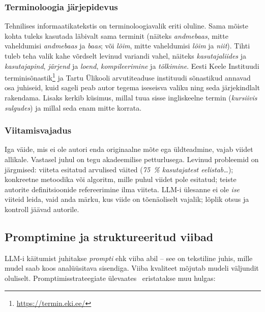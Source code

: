 \subsubsection{Terminoloogia järjepidevus}

Tehnilises informaatikatekstis on terminoloogiavalik eriti oluline. Sama mõiste kohta tuleks kasutada läbivalt sama terminit (näiteks \emph{andmebaas}, mitte vaheldumisi \emph{andmebaas} ja \emph{baas}; või \emph{lõim}, mitte vaheldumisi \emph{lõim} ja \emph{niit}). Tihti tuleb teha valik kahe võrdselt levinud variandi vahel, näiteks \emph{kasutaja\-liides} ja \emph{kasutaja\-pind}, \emph{järjend} ja \emph{loend}, \emph{kompileerimine} ja \emph{tõlkimine}. Eesti Keele Instituudi terminisõnastik\footnote{\url{https://termin.eki.ee/}} ja Tartu Ülikooli arvutiteaduse instituudi sõnastikud annavad osa juhiseid, kuid sageli peab autor tegema iseseisva valiku ning seda järjekindlalt rakendama. Lisaks kerkib küsimus, millal tuua sisse ingliskeelne termin (\emph{kursiivis sulgudes}) ja millal seda enam mitte korrata.

\subsubsection{Viitamisvajadus}

Iga väide, mis ei ole autori enda originaalne mõte ega üldteadmine, vajab viidet allikale. Vastasel juhul on tegu akadeemilise petturlusega. Levinud probleemid on järgmised: viiteta esitatud arvulised väited (\emph{75~\% kasutajatest eelistab\dots}); konkreetne metoodika või algoritm, mille puhul viidet pole esitatud; teiste autorite definitsioonide refereerimine ilma viiteta. LLM-i ülesanne ei ole \emph{ise} viiteid leida, vaid anda märku, kus viide on tõenäoliselt vajalik; lõplik otsus ja kontroll jäävad autorile.

\subsection{Promptimine ja struktureeritud viibad} \label{taust:promptimine}

LLM-i käitumist juhitakse \emph{prompti} ehk viiba abil – see on tekstiline juhis, mille mudel saab koos analüüsitava sisendiga. Viiba kvaliteet mõjutab mudeli väljundit oluliselt. Promptimisstrateegiate ülevaates~\cite{liu_prompting_2023} eristatakse muu hulgas:

